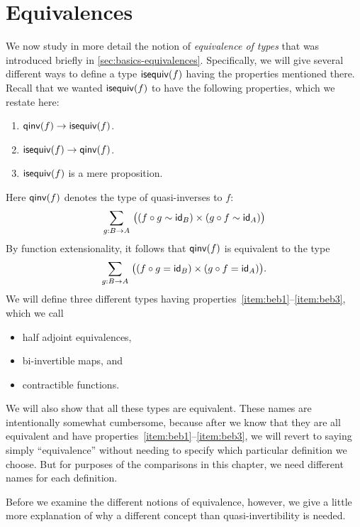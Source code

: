 \chapter{Equivalences}
\label{cha:equivalences}

We now study in more detail the notion of \emph{equivalence of types} that was introduced briefly in \autoref{sec:basics-equivalences}.
Specifically, we will give several different ways to define a type $\mathsf{isequiv}(f)$ having the properties mentioned there.
Recall that we wanted $\mathsf{isequiv}(f)$ to have the following properties, which we restate here:
\begin{enumerate}
\item $\mathsf{qinv}(f) \to \mathsf{isequiv} (f)$.\label{item:beb1}
\item $\mathsf{isequiv} (f) \to \mathsf{qinv}(f)$.\label{item:beb2}
\item $\mathsf{isequiv}(f)$ is a mere proposition.\label{item:beb3}
\end{enumerate}
Here $\mathsf{qinv}(f)$ denotes the type of quasi-inverses to $f$:
\begin{equation*}
  \sm{g:B\to A} \big((f \circ g \htpy \idfunc[B]) \times (g\circ f \htpy \idfunc[A])\big)
\end{equation*}
By function extensionality, it follows that $\mathsf{qinv}(f)$ is equivalent to the type
\begin{equation*}
  \sm{g:B\to A} \big((f \circ g = \idfunc[B]) \times (g\circ f = \idfunc[A])\big).
\end{equation*}
We will define three different types having properties~\ref{item:beb1}--\ref{item:beb3}, which we call
\begin{itemize}
\item half adjoint equivalences,
\item bi-invertible maps,
  and
\item contractible functions.
\end{itemize}
We will also show that all these types are equivalent.
These names are intentionally somewhat cumbersome, because after we know that they are all equivalent and have properties~\ref{item:beb1}--\ref{item:beb3}, we will revert to saying simply ``equivalence'' without needing to specify which particular definition we choose.
But for purposes of the comparisons in this chapter, we need different names for each definition.

Before we examine the different notions of equivalence, however, we give a little more explanation of why a different concept than quasi-invertibility is needed.


